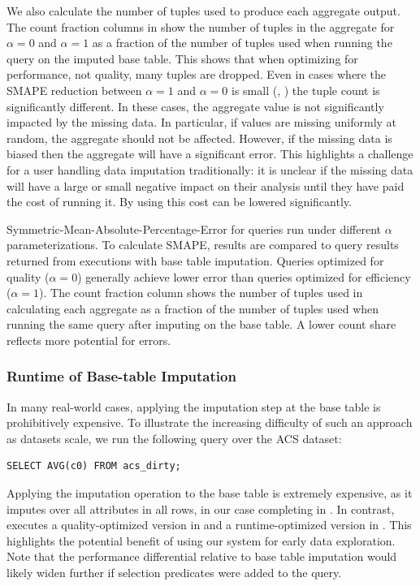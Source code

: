 We also calculate the number of tuples used to produce each aggregate output.
The count fraction columns in  show the number of tuples in the aggregate for $\alpha = 0$ and $\alpha = 1$ as a fraction of the number of tuples
used when running the query on the imputed base table.
This shows that when optimizing for performance, not quality, many tuples are dropped.
Even in cases where the SMAPE reduction between $\alpha = 1$ and $\alpha = 0$ is small (, ) the tuple count is significantly different.
In these cases, the aggregate value is not significantly impacted by the missing data. In particular, if values are missing uniformly at random,
the aggregate should not be affected.
However, if the missing data is biased then the aggregate will have a significant error.
This highlights a challenge for a user handling data imputation traditionally: it is unclear if the missing data will have a large or small negative impact on their analysis until they have paid the cost of running it.
By using \ProjectName{} this cost can be lowered significantly.

\begin{table}
\centering

\caption{Symmetric-Mean-Absolute-Percentage-Error for queries run under different $\alpha$
    parameterizations. To calculate SMAPE, \ProjectName{} results are compared to query results returned
    from executions with base table imputation. Queries optimized
    for quality ($\alpha=0$) generally achieve lower error than queries optimized for
    efficiency ($\alpha=1$). The count fraction column shows the number of tuples used in calculating each aggregate
     as a fraction of the number of tuples used when running the same query after imputing on the base table.
    A lower count share reflects more potential for errors.}
\label{table:smape}
\end{table}


\subsubsection{Runtime of Base-table Imputation}
In many real-world cases, applying the imputation step at the base table is prohibitively
expensive.
To illustrate the increasing difficulty of such an approach as datasets scale, we run the following query over the ACS dataset:
\begin{lstlisting}[breaklines]
SELECT AVG(c0) FROM acs_dirty;
\end{lstlisting}
Applying the imputation operation to the base table is extremely expensive, as it imputes over all attributes in all rows, in our case
completing in \acsbaseresultminutes{}. In contrast, \ProjectName{} executes a quality-optimized version
in \acsimputedbzeroresult{} and a runtime-optimized version in \acsimputedboneresult{}. This highlights the potential
benefit of using our system for early data exploration. Note that the performance differential relative to base table imputation
would likely widen further if selection predicates were added to the query.

